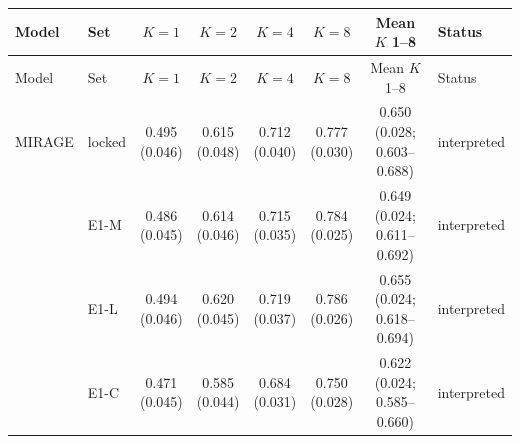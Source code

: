 \begin{longtable}{@{}p{3.6cm}lcccccp{2.6cm}@{}}
\toprule
Model & Set & $K=1$ & $K=2$ & $K=4$ & $K=8$ & Mean $K$ 1--8 & Status \\
\midrule
\endfirsthead
\toprule
Model & Set & $K=1$ & $K=2$ & $K=4$ & $K=8$ & Mean $K$ 1--8 & Status \\
\midrule
\endhead
\bottomrule
\endfoot
\bottomrule
\endlastfoot
MIRAGE & locked & \makecell{0.495\\{\scriptsize (0.046)}} & \makecell{0.615\\{\scriptsize (0.048)}} & \makecell{0.712\\{\scriptsize (0.040)}} & \makecell{0.777\\{\scriptsize (0.030)}} & \makecell{0.650\\{\scriptsize (0.028; 0.603--0.688)}} & interpreted \\
 & E1-M & \makecell{0.486\\{\scriptsize (0.045)}} & \makecell{0.614\\{\scriptsize (0.046)}} & \makecell{0.715\\{\scriptsize (0.035)}} & \makecell{0.784\\{\scriptsize (0.025)}} & \makecell{0.649\\{\scriptsize (0.024; 0.611--0.692)}} & interpreted \\
 & E1-L & \makecell{0.494\\{\scriptsize (0.046)}} & \makecell{0.620\\{\scriptsize (0.045)}} & \makecell{0.719\\{\scriptsize (0.037)}} & \makecell{0.786\\{\scriptsize (0.026)}} & \makecell{0.655\\{\scriptsize (0.024; 0.618--0.694)}} & interpreted \\
 & E1-C & \makecell{0.471\\{\scriptsize (0.045)}} & \makecell{0.585\\{\scriptsize (0.044)}} & \makecell{0.684\\{\scriptsize (0.031)}} & \makecell{0.750\\{\scriptsize (0.028)}} & \makecell{0.622\\{\scriptsize (0.024; 0.585--0.660)}} & interpreted \\

\end{longtable}
